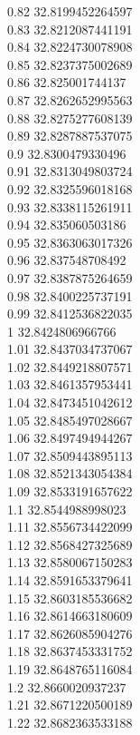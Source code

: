{0.82	32.8199452264597\\
0.83	32.8212087441191\\
0.84	32.8224730078908\\
0.85	32.8237375002689\\
0.86	32.825001744137\\
0.87	32.8262652995563\\
0.88	32.8275277608139\\
0.89	32.8287887537075\\
0.9	32.8300479330496\\
0.91	32.8313049803724\\
0.92	32.8325596018168\\
0.93	32.8338115261911\\
0.94	32.835060503186\\
0.95	32.8363063017326\\
0.96	32.837548708492\\
0.97	32.8387875264659\\
0.98	32.8400225737191\\
0.99	32.8412536822035\\
1	32.8424806966766\\
1.01	32.8437034737067\\
1.02	32.8449218807571\\
1.03	32.8461357953441\\
1.04	32.8473451042612\\
1.05	32.8485497028667\\
1.06	32.8497494944267\\
1.07	32.8509443895113\\
1.08	32.8521343054384\\
1.09	32.8533191657622\\
1.1	32.8544988998023\\
1.11	32.8556734422099\\
1.12	32.8568427325689\\
1.13	32.8580067150283\\
1.14	32.8591653379641\\
1.15	32.8603185536682\\
1.16	32.8614663180609\\
1.17	32.8626085904276\\
1.18	32.8637453331752\\
1.19	32.8648765116084\\
1.2	32.8660020937237\\
1.21	32.8671220500189\\
1.22	32.8682363533188\\
}
